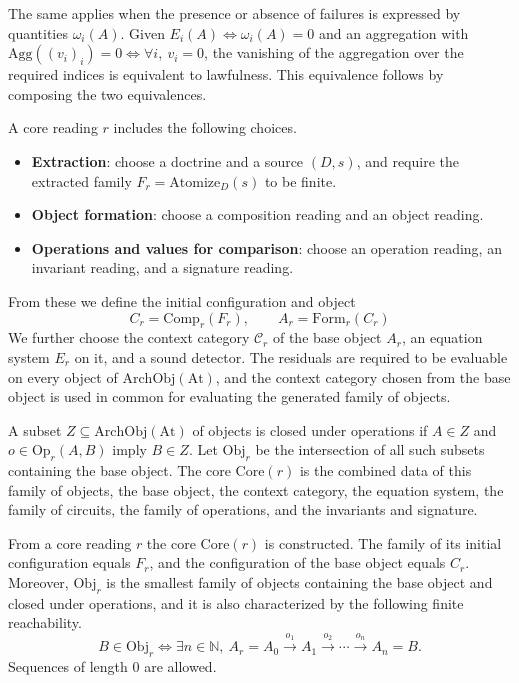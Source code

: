 The same applies when the presence or absence of failures is expressed by quantities
$\omega_i(A)$. Given $E_i(A)\Longleftrightarrow\omega_i(A)=0$ and an aggregation
with $\mathrm{Agg}((v_i)_i)=0\Longleftrightarrow\forall i,\ v_i=0$, the vanishing
of the aggregation over the required indices is equivalent to lawfulness.
This equivalence follows by composing the two equivalences.

\begin{definition}\label{def:1.17}

A core reading $r$ includes the following choices.

\begin{itemize}
\item \textbf{Extraction}: choose a doctrine and a source $(D,s)$, and require
the extracted family $F_r=\mathrm{Atomize}_D(s)$ to be finite.
\item \textbf{Object formation}: choose a composition reading and an object
reading.
\item \textbf{Operations and values for comparison}: choose an operation
reading, an invariant reading, and a signature reading.
\end{itemize}

From these we define the initial configuration and object
\[
C_r=\mathrm{Comp}_r(F_r),\qquad A_r=\mathrm{Form}_r(C_r)
\]
We further choose the context category $\mathcal{C}_r$ of the base object $A_r$,
an equation system $E_r$ on it, and a sound detector.
The residuals are required to be evaluable on every object of
$\mathrm{ArchObj}(\mathrm{At})$, and the context category chosen from the base
object is used in common for evaluating the generated family of objects.

A subset $Z\subseteq\mathrm{ArchObj}(\mathrm{At})$ of objects is closed under
operations if $A\in Z$ and $o\in\mathrm{Op}_r(A,B)$ imply $B\in Z$.
Let $\mathrm{Obj}_r$ be the intersection of all such subsets containing the base
object.
The core $\mathrm{Core}(r)$ is the combined data of this family of objects, the
base object, the context category, the equation system, the family of circuits,
the family of operations, and the invariants and signature.

\end{definition}

\begin{theorem}\label{thm:1.18}

From a core reading $r$ the core $\mathrm{Core}(r)$ is constructed.
The family of its initial configuration equals $F_r$, and the configuration of
the base object equals $C_r$.
Moreover, $\mathrm{Obj}_r$ is the smallest family of objects containing the base
object and closed under operations, and it is also characterized by the
following finite reachability.
\begin{equation*}
B\in\mathrm{Obj}_r
\Longleftrightarrow
\exists n\in\mathbb{N},\
A_r=A_0\xrightarrow{o_1}A_1\xrightarrow{o_2}
\cdots\xrightarrow{o_n}A_n=B.
\tag{1.2}\label{eq:1.2}
\end{equation*}
Sequences of length $0$ are allowed.

\end{theorem}

